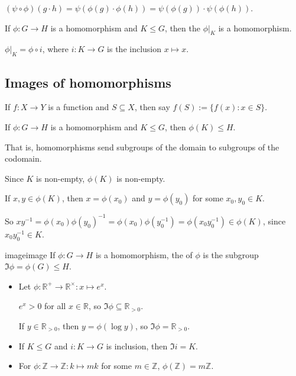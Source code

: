 \documentclass[12pt,letterpaper]{report}
\begin{document}
\begin{thmproof}
  $(\psi \circ \phi)(g \cdot h) = \psi(\phi(g) \cdot \phi(h)) = \psi(\phi(g)) \cdot \psi(\phi(h))$.
\end{thmproof}

\begin{cor}{}{}
  If $\phi \colon G \to H$ is a homomorphism and $K \leq G$, then the 
  $\phi \rvert_K$ is a homomorphism.
\end{cor}

\begin{thmproof}
  $\phi \rvert_K = \phi \circ i$, where $i \colon K \to G$ is the inclusion $x \mapsto x$.
\end{thmproof}

\pagebreak
\subsection{Images of homomorphisms}

If $f \colon X \to Y$ is a function and $S \subseteq X$, then say $f(S) := \{ f(x) : x \in S \}$.

\begin{prop}{}{}
  If $\phi \colon G \to H$ is a homomorphism and $K \leq G$, then $\phi(K) \leq H$.
\end{prop}

That is, homomorphisms send subgroups of the domain to subgroups of the codomain.

\begin{thmproof}
  Since $K$ is non-empty, $\phi(K)$ is non-empty.

  If $x, y \in \phi(K)$, then $x = \phi(x_0)$ and $y = \phi(y_0)$ for some $x_0, y_0 \in K$.

  So $xy^{-1} = \phi(x_0)\phi(y_0)^{-1} = \phi(x_0)\phi(y_0^{-1}) = \phi(x_0 y_0^{-1}) \in \phi(K)$,
  since $x_0 y_0^{-1} \in K$.
\end{thmproof}

\begin{defn}{image}{image}
  If $\phi \colon G \to H$ is a homomorphism, the  of $\phi$ is the subgroup
  $\Im \phi = \phi(G) \leq H$.
\end{defn}

\begin{ex}
  \begin{itemize}
    \item
    Let $\phi \colon \mathbb{R}^+ \to \mathbb{R}^\times : x \mapsto e^x$.

    $e^x > 0$ for all $x \in \mathbb{R}$, so $\Im \phi \subseteq \mathbb{R}_{> 0}$.

    If $y \in \mathbb{R}_{> 0}$, then $y = \phi(\log y)$, so $\Im \phi = \mathbb{R}_{> 0}$.
    \item
    If $K \leq G$ and $i \colon K \to G$ is inclusion, then $\Im i = K$.
    \item
    For $\phi \colon \mathbb{Z} \to \mathbb{Z} : k \mapsto mk$ for some $m \in \mathbb{Z}$,
    $\phi(\mathbb{Z}) = m\mathbb{Z}$.
  \end{itemize}
\end{ex}
\end{document}
